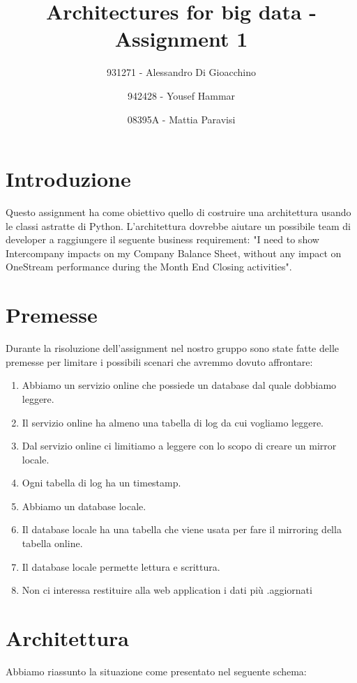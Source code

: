 \documentclass[a4paper]{article}
\title{Architectures for big data - Assignment 1}
\author{931271 - Alessandro Di Gioacchino \and 942428 - Yousef Hammar \and 08395A - Mattia Paravisi}
\begin{document}
\maketitle
\newpage

\section{Introduzione}
Questo assignment ha come obiettivo quello di costruire una architettura usando le classi astratte di Python. L'architettura dovrebbe
aiutare un possibile team di developer a raggiungere il seguente business requirement: "I need to show Intercompany impacts on my Company Balance Sheet, without any impact on OneStream
performance during the Month End Closing activities".

\section{Premesse}
Durante la risoluzione dell'assignment nel nostro gruppo sono state fatte delle premesse per limitare i possibili scenari che avremmo dovuto affrontare:
\begin{enumerate}
    \item Abbiamo un servizio online che possiede un database dal quale dobbiamo leggere.
    \item Il servizio online ha almeno una tabella di log da cui vogliamo leggere.
    \item Dal servizio online ci limitiamo a leggere con lo scopo di creare un mirror locale.
    \item Ogni tabella di log ha un timestamp.
    \item Abbiamo un database locale.
    \item Il database locale ha una tabella che viene usata per fare il mirroring della tabella online.
    \item Il database locale permette lettura e scrittura.
    \item Non ci interessa restituire alla web application i dati più
    .aggiornati
\end{enumerate}

\section{Architettura}
Abbiamo riassunto la situazione come presentato nel seguente schema:
\end{document}
